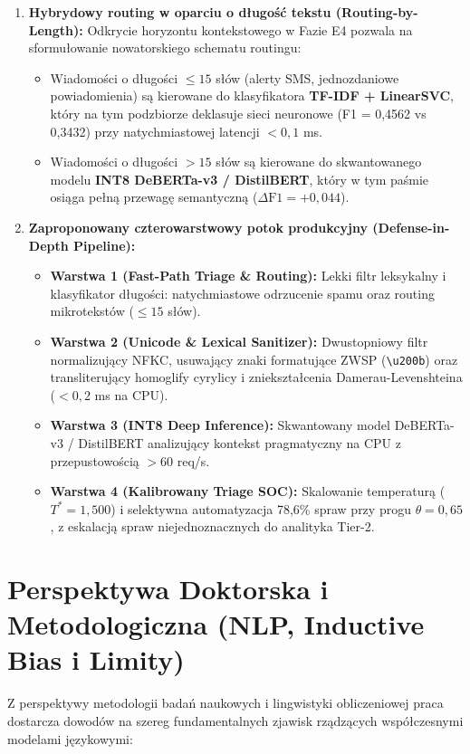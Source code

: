\documentclass[12pt,a4paper,twoside]{report}
\begin{document}
\begin{enumerate}[leftmargin=1.5em]
  \item \textbf{Hybrydowy routing w oparciu o długość tekstu (Routing-by-Length):} Odkrycie horyzontu kontekstowego w Fazie E4 pozwala na sformułowanie nowatorskiego schematu routingu:
  \begin{itemize}
    \item Wiadomości o długości $\le 15$ słów (alerty SMS, jednozdaniowe powiadomienia) są kierowane do klasyfikatora \textbf{TF-IDF + LinearSVC}, który na tym podzbiorze deklasuje sieci neuronowe (F1 = 0,4562 vs 0,3432) przy natychmiastowej latencji $<0,1$ ms.
    \item Wiadomości o długości $>15$ słów są kierowane do skwantowanego modelu \textbf{INT8 DeBERTa-v3 / DistilBERT}, który w tym paśmie osiąga pełną przewagę semantyczną ($\Delta \text{F1} = +0,044$).
  \end{itemize}

  \item \textbf{Zaproponowany czterowarstwowy potok produkcyjny (Defense-in-Depth Pipeline):}
  \begin{itemize}
    \item \textbf{Warstwa 1 (Fast-Path Triage \& Routing):} Lekki filtr leksykalny i klasyfikator długości: natychmiastowe odrzucenie spamu oraz routing mikrotekstów ($\le 15$ słów).
    \item \textbf{Warstwa 2 (Unicode \& Lexical Sanitizer):} Dwustopniowy filtr normalizujący NFKC, usuwający znaki formatujące ZWSP (\texttt{\textbackslash u200b}) oraz transliterujący homoglify cyrylicy i zniekształcenia Damerau-Levenshteina ($<0,2$ ms na CPU).
    \item \textbf{Warstwa 3 (INT8 Deep Inference):} Skwantowany model DeBERTa-v3 / DistilBERT analizujący kontekst pragmatyczny na CPU z przepustowością $>60$ req/s.
    \item \textbf{Warstwa 4 (Kalibrowany Triage SOC):} Skalowanie temperaturą ($T^*=1,500$) i selektywna automatyzacja 78,6\% spraw przy progu $\theta=0,65$, z eskalacją spraw niejednoznacznych do analityka Tier-2.
  \end{itemize}
\end{enumerate}

\section{Perspektywa Doktorska i Metodologiczna (NLP, Inductive Bias i Limity)}\label{sec:phd}
Z perspektywy metodologii badań naukowych i lingwistyki obliczeniowej praca dostarcza dowodów na szereg fundamentalnych zjawisk rządzących współczesnymi modelami językowymi:
\end{document}
